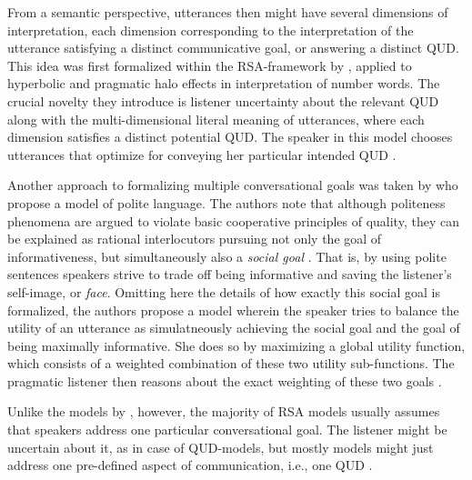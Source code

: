 From a semantic perspective, utterances then might have several dimensions of interpretation, each dimension corresponding to the interpretation of the utterance satisfying a distinct communicative goal, or answering a distinct QUD. This idea was first formalized within the RSA-framework by \textcite{kao2014nonliteral}, applied to hyperbolic and pragmatic halo effects in interpretation of number words. The crucial novelty they introduce is listener uncertainty about the relevant QUD along with the multi-dimensional literal meaning of utterances, where each dimension satisfies a distinct potential QUD. The speaker in this model chooses utterances that optimize for conveying her particular intended QUD \parencite{kao2014nonliteral}. %

Another approach to formalizing multiple conversational goals was taken by \textcite{yoon2016talking} who propose a model of polite language. The authors note that although politeness phenomena are argued to violate basic cooperative principles of quality, they can be explained as rational interlocutors pursuing not only the goal of informativeness, but simultaneously also a \emph{social goal} \parencite[cf.][]{brown1987politeness, yoon2016talking}. That is, by using polite sentences speakers strive to trade off being informative and saving the listener's self-image, or \emph{face}. Omitting here the details of how exactly this social goal is formalized, the authors propose a model wherein the speaker tries to balance the utility of an utterance as simulatneously achieving the social goal and the goal of being maximally informative. She does so by maximizing a global utility function, which consists of a weighted combination of these two utility sub-functions. The pragmatic listener then reasons about the exact weighting of these two goals \parencite{yoon2016talking}. 

Unlike the models by \textcite{kao2014nonliteral, yoon2016talking}, however, the majority of RSA models usually assumes that speakers address one particular conversational goal. The listener might be uncertain about it, as in case of QUD-models, but mostly models might just address one pre-defined aspect of communication, i.e., one QUD \parencite[see][for an overview of various RSA models]{problang}. 

